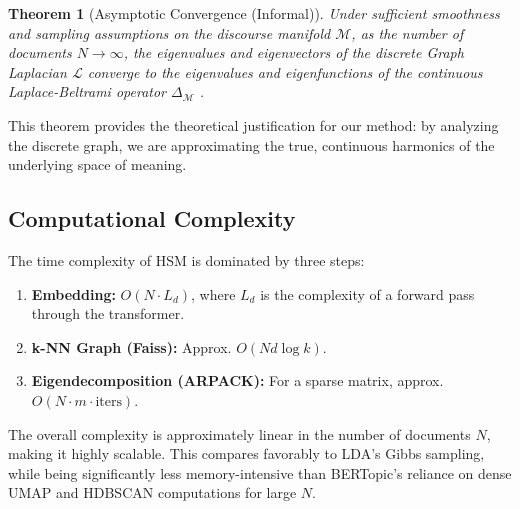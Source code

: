 \documentclass[conference]{IEEEtran}
\newtheorem{theorem}{Theorem}
\begin{document}
\begin{theorem}[Asymptotic Convergence (Informal)]
Under sufficient smoothness and sampling assumptions on the discourse manifold $\mathcal{M}$, as the number of documents $N \to \infty$, the eigenvalues and eigenvectors of the discrete Graph Laplacian $\mathcal{L}$ converge to the eigenvalues and eigenfunctions of the continuous Laplace-Beltrami operator $\Delta_{\mathcal{M}}$ \cite{belkin2003laplacian}.
\end{theorem}
This theorem provides the theoretical justification for our method: by analyzing the discrete graph, we are approximating the true, continuous harmonics of the underlying space of meaning.

\subsection{Computational Complexity}
The time complexity of HSM is dominated by three steps:
\begin{enumerate}
    \item \textbf{Embedding:} $O(N \cdot L_d)$, where $L_d$ is the complexity of a forward pass through the transformer.
    \item \textbf{k-NN Graph (Faiss):} Approx. $O(N d \log k)$.
    \item \textbf{Eigendecomposition (ARPACK):} For a sparse matrix, approx. $O(N \cdot m \cdot \text{iters})$.
\end{enumerate}
The overall complexity is approximately linear in the number of documents $N$, making it highly scalable. This compares favorably to LDA's Gibbs sampling, while being significantly less memory-intensive than BERTopic's reliance on dense UMAP and HDBSCAN computations for large $N$.
\end{document}
